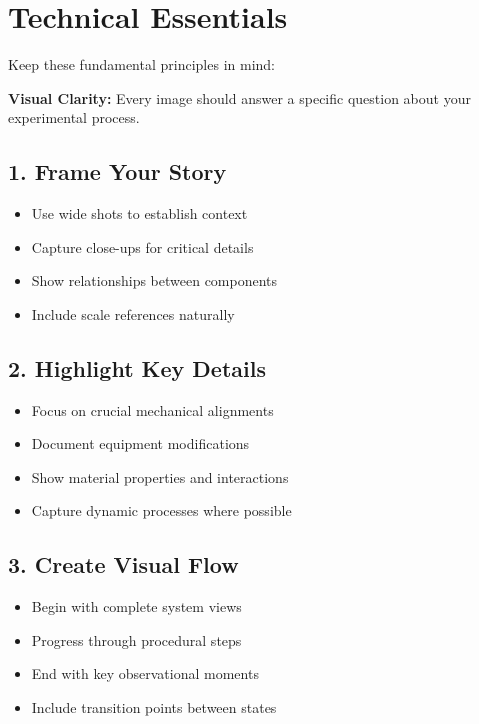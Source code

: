\documentclass[11pt]{article}
\begin{document}
\section*{Technical Essentials}

Keep these fundamental principles in mind:

\begin{conceptbox}
\textbf{Visual Clarity:} Every image should answer a specific question about your experimental process.
\end{conceptbox}

\subsection*{1. Frame Your Story}
\begin{itemize}[leftmargin=*]
    \item Use wide shots to establish context
    \item Capture close-ups for critical details
    \item Show relationships between components
    \item Include scale references naturally
\end{itemize}

\subsection*{2. Highlight Key Details}
\begin{itemize}[leftmargin=*]
    \item Focus on crucial mechanical alignments
    \item Document equipment modifications
    \item Show material properties and interactions
    \item Capture dynamic processes where possible
\end{itemize}

\subsection*{3. Create Visual Flow}
\begin{itemize}[leftmargin=*]
    \item Begin with complete system views
    \item Progress through procedural steps
    \item End with key observational moments
    \item Include transition points between states
\end{itemize}
\end{document}
